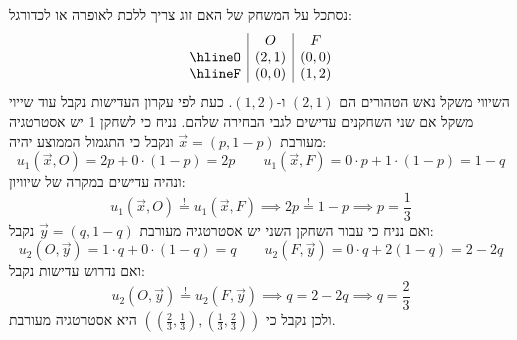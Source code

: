 \documentclass{tstextbook}
\begin{document}
\begin{example}
נסתכל על המשחק של האם זוג צריך ללכת לאופרה או לכדורגל:
$$\begin{array}{c|c|c} & O & F \\ \hlineO & (2,1) & (0,0) \\ \hlineF & (0,0) & (1,2)
\end{array}$$
השיווי משקל נאש הטהורים הם \((2,1)\) ו-\((1,2)\). כעת לפי עקרון העדישות נקבל עוד שייוי משקל אם שני השחקנים עדישים לגבי הבחירה שלהם. נניח כי לשחקן 1 יש אסטרטגיה מעורבת \(\vec{x}=(p,1-p)\) ונקבל כי התגמול הממוצע יהיה:
$$u_{1}\left( \vec{x},O \right)=2p+0\cdot(1-p)=2p\qquad u_{1}\left( \vec{x},F \right)=0\cdot p+1\cdot(1-p)=1-q$$
ונהיה עדישים במקרה של שיוויון:
$$u_{1}\left( \vec{x},O \right)\overset{!}{=} u_{1}\left( \vec{x},F \right)\implies 2p\overset{!}{=}  1-p\implies p=\frac{1}{3}$$
ואם נניח כי עבור השחקן השני יש אסטרטגיה מעורבת \(\vec{y}=(q,1-q)\) נקבל:
$$u_{2}\left( O,\vec{y} \right)=1\cdot q+0\cdot(1-q)=q\qquad u_{2}\left( F,\vec{y} \right)=0\cdot q+2(1-q)=2-2q$$
ואם נדרוש עדישות נקבל:
$$u_{2}\left( O,\vec{y} \right)\overset{!}{=} u_{2}\left( F,\vec{y} \right)\implies q=2-2q\implies q=\frac{2}{3}$$
ולכן נקבל כי \(\left( \left( \frac{2}{3},\frac{1}{3} \right),\left( \frac{1}{3},\frac{2}{3} \right)  \right)\) היא אסטרטגיה מעורבת.

\end{example}
\end{document}
